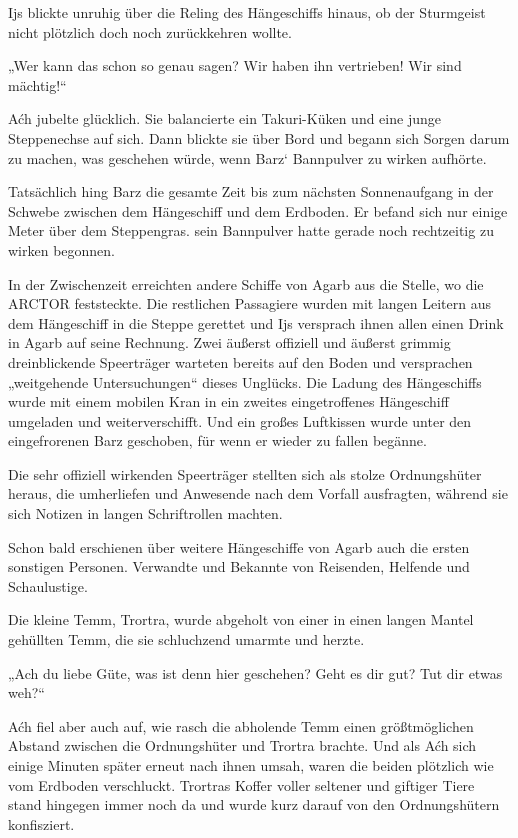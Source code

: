 Ijs blickte unruhig über die Reling des Hängeschiffs hinaus, ob der Sturmgeist nicht plötzlich doch noch zurückkehren wollte.

„Wer kann das schon so genau sagen? Wir haben ihn vertrieben! Wir sind mächtig!“

Aćh jubelte glücklich. Sie balancierte ein Takuri-Küken und eine junge Steppenechse auf sich. Dann blickte sie über Bord und begann sich Sorgen darum zu machen, was geschehen würde, wenn Barz‘ Bannpulver zu wirken aufhörte.\bigskip







Tatsächlich hing Barz die gesamte Zeit bis zum nächsten Sonnenaufgang in der Schwebe zwischen dem Hängeschiff und dem Erdboden. Er befand sich nur einige Meter über dem Steppengras. sein Bannpulver hatte gerade noch rechtzeitig zu wirken begonnen.

In der Zwischenzeit erreichten andere Schiffe von Agarb aus die Stelle, wo die ARCTOR feststeckte. Die restlichen Passagiere wurden mit langen Leitern aus dem Hängeschiff in die Steppe gerettet und Ijs versprach ihnen allen einen Drink in Agarb auf seine Rechnung. Zwei äußerst offiziell und äußerst grimmig dreinblickende Speerträger warteten bereits auf den Boden und versprachen „weitgehende Untersuchungen“ dieses Unglücks. Die Ladung des Hängeschiffs wurde mit einem mobilen Kran in ein zweites eingetroffenes Hängeschiff umgeladen und weiterverschifft. Und ein großes Luftkissen wurde unter den eingefrorenen Barz geschoben, für wenn er wieder zu fallen begänne.

Die sehr offiziell wirkenden Speerträger stellten sich als stolze Ordnungshüter heraus, die umherliefen und Anwesende nach dem Vorfall ausfragten, während sie sich Notizen in langen Schriftrollen machten.

Schon bald erschienen über weitere Hängeschiffe von Agarb auch die ersten sonstigen Personen. Verwandte und Bekannte von Reisenden, Helfende und Schaulustige.

Die kleine Temm, Trortra, wurde abgeholt von einer in einen langen Mantel gehüllten Temm, die sie schluchzend umarmte und herzte.

„Ach du liebe Güte, was ist denn hier geschehen? Geht es dir gut? Tut dir etwas weh?“

Aćh fiel aber auch auf, wie rasch die abholende Temm einen größtmöglichen Abstand zwischen die Ordnungshüter und Trortra brachte. Und als Aćh sich einige Minuten später erneut nach ihnen umsah, waren die beiden plötzlich wie vom Erdboden verschluckt. Trortras Koffer voller seltener und giftiger Tiere stand hingegen immer noch da und wurde kurz darauf von den Ordnungshütern konfisziert.

